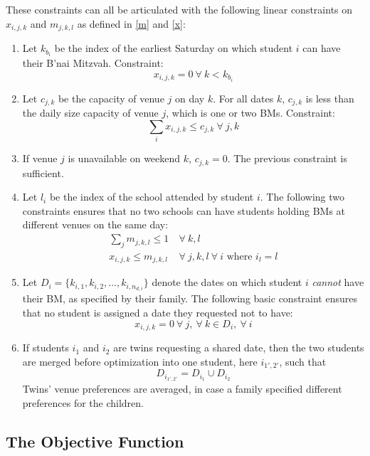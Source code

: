 \documentclass[11pt]{article}
\newcommand{\fa}{\ \forall \ }
\begin{document}
These constraints can all be articulated with the following linear constraints on $x_{i,j,k}$ and $m_{j,k,l}$ as defined in \eqref{m} and \eqref{x}:

\begin{enumerate}

\item Let $k_{b_i}$ be the index of the earliest Saturday on which student $i$ can have their B'nai Mitzvah. Constraint:
\[
x_{i,j,k} = 0 \fa k < k_{b_i}
\]

\item Let $c_{j,k}$ be the capacity of venue $j$ on day $k$. For all dates $k$, $c_{j,k}$ is less than the daily size capacity of venue $j$, which is one or two BMs. Constraint:
\[
\sum_{i} x_{i,j,k} \le c_{j,k} \fa j,k
\]

\item If venue $j$ is unavailable on weekend $k$, $c_{j,k}=0$. The previous constraint is sufficient.

\item Let $l_i$ be the index of the school attended by student $i$. The following two constraints ensures that no two schools can have students holding BMs at different venues on the same day:
\begin{align*}
\sum_j m_{j,k,l} \le 1 & \fa k,l \\
x_{i,j,k} \le m_{j,k,l} & \fa j,k,l \fa i \text{ where } i_l = l
\end{align*}

\item Let $D_i = \{k_{i,1},k_{i,2},\ldots, k_{i,n_{d,i}} \}$ denote the dates on which student $i$ \emph{cannot} have their BM, as specified by their family. The following basic constraint ensures that no student is assigned a date they requested not to have:
\[
x_{i,j,k} = 0 \fa j, \fa k \in D_i, \fa i
\]

\item If students $i_1$ and $i_2$ are twins requesting a shared date, then the two students are merged before optimization into one student, here $i_{1',2'}$, such that
\[
D_{i_{1',2'}} = D_{i_1} \cup D_{i_2}
\]
Twins' venue preferences are averaged, in case a family specified different preferences for the children.


\end{enumerate}


\subsection{The Objective Function}
\end{document}
